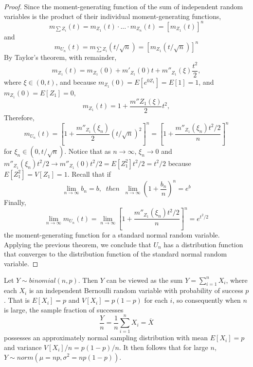 \documentclass[12pt, a4paper, twoside, openright, titlepage]{book}
\begin{document}
\begin{proof}{}{}
    Since the moment-generating function of the sum of independent random variables is the product of their individual moment-generating functions, \begin{equation*}
        m_{\sum Z_i}(t) = m_{Z_1}(t)\cdot ... \cdot m_{Z_n}(t) = [m_{Z_1}(t)]^n
    \end{equation*}
    and \begin{equation*}
        m_{U_n}(t) = m_{\sum Z_i}(t/\sqrt{n}) = \left[m_{Z_1}(t/\sqrt{n})\right]^n
    \end{equation*}
    By Taylor's theorem, with remainder, \begin{equation*}
        m_{Z_1}(t) = m_{Z_1}(0) + m'_{Z_1}(0)t + m''_{Z_1}(\xi)\frac{t^2}{2},
    \end{equation*}
    where $\xi \in (0,t)$, and because $m_{Z_1}(0) = E[e^{0Z_1}] = E[1] = 1$, and $m_{Z_1}(0) = E[Z_1] = 0$, \begin{equation*}
        m_{Z_1}(t) = 1 + \frac{m''{Z_1}(\xi)}{2}t^2,
    \end{equation*}
    Therefore, \begin{equation*}
        m_{U_n}(t) = \left[1+\frac{m''_{Z_1}(\xi_n)}{2}(t/\sqrt{n})^2\right]^n = \left[1+\frac{m''_{Z_1}(\xi_n)t^2/2}{n}\right]^n
    \end{equation*}
    for $\xi_n \in (0,t/\sqrt{n})$. Notice that as $n \rightarrow \infty$, $\xi_n \rightarrow 0$ and $m''_{Z_1}(\xi_n)t^2/2 \rightarrow m''_{Z_1}(0)t^2/2 = E[Z_1^2]t^2/2 = t^2/2$ because $E[Z_1^2] = V[Z_1] = 1$. Recall that if \begin{equation*}
        \lim\limits_{n\rightarrow \infty}b_n = b,\;\;then\;\;\lim\limits_{n\rightarrow \infty}\left(1 + \frac{b_n}{n}\right)^n = e^b
    \end{equation*}
    Finally, \begin{equation*}
        \lim\limits_{n\rightarrow \infty}m_{U_n}(t) = \lim\limits_{n\rightarrow \infty}\left[1+\frac{m''_{Z_1}(\xi_n)t^2/2}{n}\right]^n = e^{t^2/2}
    \end{equation*}
    the moment-generating function for a standard normal random variable. Applying the previous theorem, we conclude that $U_n$ has a distribution function that converges to the distribution function of the standard normal random variable.
\end{proof}

Let $Y\sim binomial(n,p)$. Then $Y$ can be viewed as the sum $Y = \sum\limits_{i=1}^nX_i$, where each $X_i$ is an independent Bernoulli random variable with probability of success $p$. That is $E[X_i] = p$ and $V[X_i] = p(1-p)$ for each $i$, so consequently when $n$ is large, the sample fraction of successes \begin{equation*}
    \frac{Y}{n} = \frac{1}{n}\sum\limits_{i=1}^nX_i = \overline{X}
\end{equation*}
possesses an approximately normal sampling distribution with mean $E[X_i] = p$ and variance $V[X_i]/n = p(1-p)/n$. It then follows that for large $n$, $Y \sim norm(\mu= np, \sigma^2 = np(1-p))$.
\end{document}
